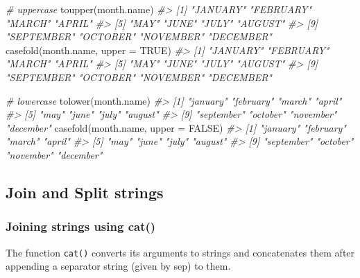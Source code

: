 \documentclass[
]{book}
\newenvironment{Shaded}{\begin{snugshade}}{\end{snugshade}}
\newcommand{\AttributeTok}[1]{\textcolor[rgb]{0.77,0.63,0.00}{#1}}
\newcommand{\CommentTok}[1]{\textcolor[rgb]{0.56,0.35,0.01}{\textit{#1}}}
\newcommand{\ConstantTok}[1]{\textcolor[rgb]{0.00,0.00,0.00}{#1}}
\newcommand{\FunctionTok}[1]{\textcolor[rgb]{0.00,0.00,0.00}{#1}}
\newcommand{\NormalTok}[1]{#1}
\begin{document}
\begin{Shaded}
\begin{Highlighting}[]
\CommentTok{\# uppercase}
\FunctionTok{toupper}\NormalTok{(month.name)}
\CommentTok{\#\textgreater{}  [1] "JANUARY"   "FEBRUARY"  "MARCH"     "APRIL"    }
\CommentTok{\#\textgreater{}  [5] "MAY"       "JUNE"      "JULY"      "AUGUST"   }
\CommentTok{\#\textgreater{}  [9] "SEPTEMBER" "OCTOBER"   "NOVEMBER"  "DECEMBER"}
\FunctionTok{casefold}\NormalTok{(month.name, }\AttributeTok{upper =} \ConstantTok{TRUE}\NormalTok{)}
\CommentTok{\#\textgreater{}  [1] "JANUARY"   "FEBRUARY"  "MARCH"     "APRIL"    }
\CommentTok{\#\textgreater{}  [5] "MAY"       "JUNE"      "JULY"      "AUGUST"   }
\CommentTok{\#\textgreater{}  [9] "SEPTEMBER" "OCTOBER"   "NOVEMBER"  "DECEMBER"}

\CommentTok{\# lowercase}
\FunctionTok{tolower}\NormalTok{(month.name)}
\CommentTok{\#\textgreater{}  [1] "january"   "february"  "march"     "april"    }
\CommentTok{\#\textgreater{}  [5] "may"       "june"      "july"      "august"   }
\CommentTok{\#\textgreater{}  [9] "september" "october"   "november"  "december"}
\FunctionTok{casefold}\NormalTok{(month.name, }\AttributeTok{upper =} \ConstantTok{FALSE}\NormalTok{)}
\CommentTok{\#\textgreater{}  [1] "january"   "february"  "march"     "april"    }
\CommentTok{\#\textgreater{}  [5] "may"       "june"      "july"      "august"   }
\CommentTok{\#\textgreater{}  [9] "september" "october"   "november"  "december"}
\end{Highlighting}
\end{Shaded}

\hypertarget{join-and-split-strings}{%
\subsection{Join and Split strings}\label{join-and-split-strings}}

\hypertarget{joining-strings-using-cat}{%
\subsubsection{Joining strings using cat()}\label{joining-strings-using-cat}}

The function \texttt{cat()} converts its arguments to strings and concatenates them after appending a separator string (given by sep) to them.
\end{document}
